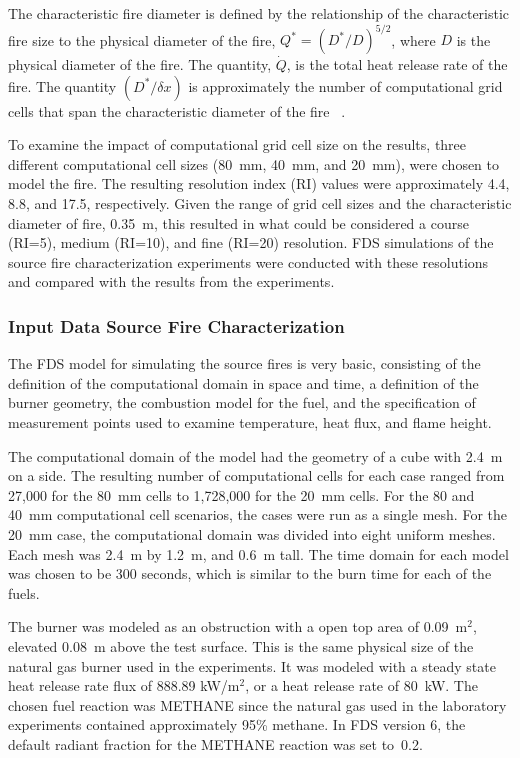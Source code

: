 \documentclass[twoside]{uocthesis}
\begin{document}
{The characteristic fire diameter is defined by the relationship of the characteristic fire size to the physical diameter of the fire, ${Q^*} = ({D^*}/{D})^{5/2}$, where $D$ is the physical diameter of the fire. The quantity, $\dot Q$, is the total heat release rate of the fire. The quantity $({D^*}/{\delta x})$ is approximately the number of computational grid cells that span the characteristic diameter of the fire ~\cite{FDS_Users_Guide,FDS_Validation_Guide}.  

To examine the impact of computational grid cell size on the results, three different computational cell sizes (80~mm, 40~mm, and 20~mm), were chosen to model the fire. The resulting resolution index (RI) values were approximately 4.4, 8.8, and 17.5, respectively. Given the range of grid cell sizes and the characteristic diameter of fire, 0.35~m, this resulted in what could be considered a course (RI=5), medium (RI=10), and fine (RI=20) resolution.  FDS simulations of the source fire characterization experiments were conducted with these resolutions and compared with the results from the experiments.

\subsubsection{Input Data Source Fire Characterization}

The FDS model for simulating the source fires is very basic, consisting of the definition of the computational domain in space and time, a definition of the burner geometry, the combustion model for the fuel, and the specification of measurement points used to examine temperature, heat flux, and flame height.

The computational domain of the model had the geometry of a cube with 2.4~m on a side.  The resulting number of computational cells for each case ranged from 27,000 for the 80~mm cells to 1,728,000 for the 20~mm cells. For the 80 and 40~mm computational cell scenarios, the cases were run as a single mesh.  For the 20~mm case, the computational domain was divided into eight uniform meshes.  Each mesh was 2.4~m by 1.2~m, and 0.6~m tall.  The time domain for each model was chosen to be 300 seconds, which is similar to the burn time for each of the fuels.    

The burner was modeled as an obstruction with a open top area of 0.09~m$^2$, elevated 0.08~m above the test surface.  This is the same physical size of the natural gas burner used in the experiments.  It was modeled with a steady state heat release rate flux of 888.89 kW/m$^2$, or a heat release rate of 80~kW.   The chosen fuel reaction was METHANE since the natural gas used in the laboratory experiments contained approximately 95\% methane.  In FDS version 6, the default radiant fraction for the METHANE reaction was set to~0.2.  

}
\end{document}
